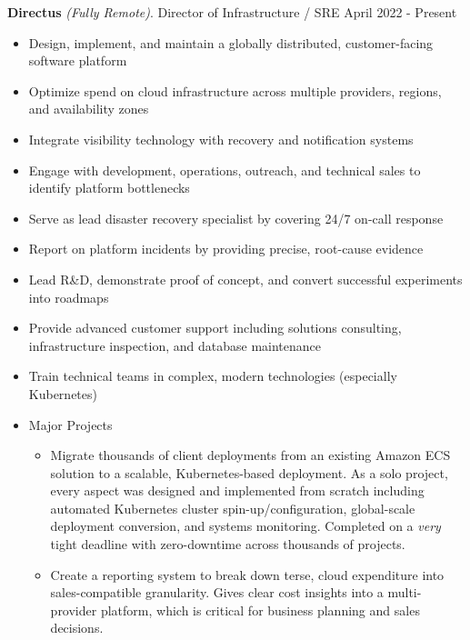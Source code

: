 \documentclass[letterpaper,11pt]{article}
\begin{document}
\textbf{Directus} \textit{(Fully Remote)}. Director of Infrastructure / SRE \hfill April 2022 - Present
\begin{itemize}[noitemsep,topsep=0pt]
	\item Design, implement, and maintain a globally distributed, customer-facing software platform
	\item Optimize spend on cloud infrastructure across multiple providers, regions, and availability zones
	\item Integrate visibility technology with recovery and notification systems
	\item Engage with development, operations, outreach, and technical sales to identify platform bottlenecks
	\item Serve as lead disaster recovery specialist by covering 24/7 on-call response
	\item Report on platform incidents by providing precise, root-cause evidence
	\item Lead R\&D, demonstrate proof of concept, and convert successful experiments into roadmaps
	\item Provide advanced customer support including solutions consulting, infrastructure inspection, and database maintenance
	\item Train technical teams in complex, modern technologies (especially Kubernetes)
	\item Major Projects \begin{itemize}[noitemsep, topsep=0pt]
		\item Migrate thousands of client deployments from an existing Amazon ECS solution to a scalable, Kubernetes-based deployment. As a solo project, every aspect was designed and implemented from scratch including automated Kubernetes cluster spin-up/configuration, global-scale deployment conversion, and systems monitoring. Completed on a \textit{very} tight deadline with zero-downtime across thousands of projects.
		\item Create a reporting system to break down terse, cloud expenditure into sales-compatible granularity. Gives clear cost insights into a multi-provider platform, which is critical for business planning and sales decisions.\\
	\end{itemize}
\end{itemize}
\end{document}
